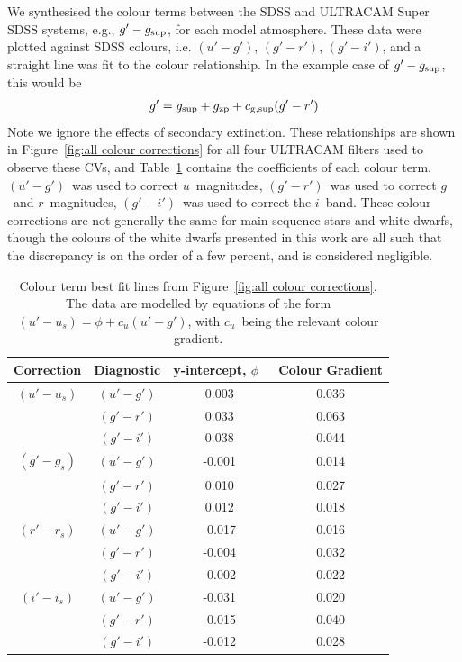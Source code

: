 We synthesised the colour terms between the SDSS and ULTRACAM Super SDSS systems, e.g., $g'-g_{\rm sup}$, for each model atmosphere. These data were plotted against SDSS colours, i.e. $(u'-g')$, $(g'-r')$, $(g'-i')$, and a straight line was fit to the colour relationship. In the example case of $g'-g_{\rm sup}$, this would be
\begin{align*}
    g' &= g_{\rm sup} + g_{\rm zp} + c_{\rm g, sup}(g'-r') \\
\end{align*}
Note we ignore the effects of secondary extinction. 
These relationships are shown in Figure~\ref{fig:all colour corrections} for all four ULTRACAM filters used to observe these CVs, and Table~\ref{table:all colour corrections} contains the coefficients of each colour term.
$(u'-g')$\ was used to correct $u$\ magnitudes, $(g'-r')$\ was used to correct $g$\ and $r$\ magnitudes, $(g'-i')$\ was used to correct the $i$\ band.
These colour corrections are not generally the same for main sequence stars and white dwarfs, though the colours of the white dwarfs presented in this work are all such that the discrepancy is on the order of a few percent, and is considered negligible.

\begin{table}
    \centering
    \caption{Colour term best fit lines from Figure~\ref{fig:all colour corrections}. The data are modelled by equations of the form $(u'-u_s) = \phi + c_u(u'-g')$, with $c_u$\ being the relevant colour gradient.}
    \label{table:all colour corrections}
    \begin{tabular}{cccc}
        Correction & Diagnostic &   y-intercept, $\phi$\   & Colour Gradient \\
        \hline
        \hline
          $(u'-u_s)$ &  $(u'-g')$   & 0.003 & 0.036 \\
                    &  $(g'-r')$   & 0.033 & 0.063 \\
                    &  $(g'-i')$   & 0.038 & 0.044 \\
        \hline
          $(g'-g_s)$ &  $(u'-g')$   & -0.001 & 0.014 \\
                    &  $(g'-r')$   & 0.010  & 0.027 \\
                    &  $(g'-i')$   & 0.012  & 0.018 \\
        \hline
          $(r'-r_s)$ &  $(u'-g')$   & -0.017 & 0.016 \\
                    &  $(g'-r')$   & -0.004 & 0.032 \\
                    &  $(g'-i')$   & -0.002 & 0.022 \\
        \hline
          $(i'-i_s)$ &  $(u'-g')$   & -0.031 & 0.020 \\
                    &  $(g'-r')$   & -0.015 & 0.040 \\
                    &  $(g'-i')$   & -0.012 & 0.028 \\
        \hline
        \hline
    \end{tabular}
\end{table}

